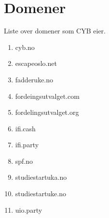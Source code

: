 \chapter*{Domener}

Liste over domener som CYB eier.

\begin{enumerate}
	\item cyb.no
	\item escapeoslo.net
	\item fadderuke.no
	\item fordeingsutvalget.com
	\item fordelingsutvalget.org
	\item ifi.cash
	\item ifi.party
	\item spf.no
	\item studiestartuka.no
	\item studiestartuke.no
	\item uio.party
\end{enumerate}

